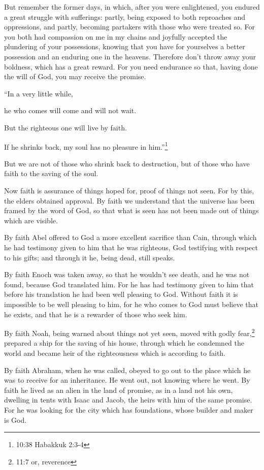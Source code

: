 \myverse{}But remember the former days, in which, after you were enlightened,
you endured a great struggle with sufferings:
\myverse{}partly, being exposed to both reproaches and oppressions, and partly, becoming
partakers with those who were treated so.
\myverse{}For you both had compassion on me in my chains and joyfully accepted the
plundering of your possessions, knowing that you have for yourselves a better possession and an enduring
one in the heavens.
\myverse{}Therefore don’t throw away your boldness, which has a great reward.
\myverse{}For you need endurance so that, having done the will of God, you may receive
the promise.

\myverse{}“In a very little while,

he who comes will come and will not wait.

\myverse{}But the righteous one will live by faith.

If he shrinks back, my soul has no pleasure in him.”\footnote{10:38 Habakkuk 2:3-4}

\myverse{}But we are not of those who shrink back to destruction, but
of those who have faith to the saving of the soul.


\mychapter{} \myverse*{}Now faith is assurance of things hoped for, proof of things not
seen.
\myverse{}For by this, the elders obtained approval.
\myverse{}By faith we understand that the universe has been framed by the word of God,
so that what is seen has not been made out of things which are visible.

\myverse{}By faith Abel offered to God a more excellent sacrifice than Cain,
through which he had testimony given to him that he was righteous, God testifying with respect to his
gifts; and through it he, being dead, still speaks.

\myverse{}By faith Enoch was taken away, so that he wouldn’t see death,
and he was not found, because God translated him. For he has had testimony given to him that before his
translation he had been well pleasing to God.
\myverse{}Without faith it is impossible to be well pleasing to him, for he who comes
to God must believe that he exists, and that he is a rewarder of those who seek him.

\myverse{}By faith Noah, being warned about things not yet seen, moved with
godly fear,\footnote{11:7 or, reverence} prepared a ship for the saving of his house, through which he condemned
the world and became heir of the righteousness which is according to faith.

\myverse{}By faith Abraham, when he was called, obeyed to go out to the
place which he was to receive for an inheritance. He went out, not knowing where he went.
\myverse{}By faith he lived as an alien in the land of promise, as in a land not his
own, dwelling in tents with Isaac and Jacob, the heirs with him of the same promise.
\myverse{}For he was looking for the city which has foundations, whose builder and
maker is God.

